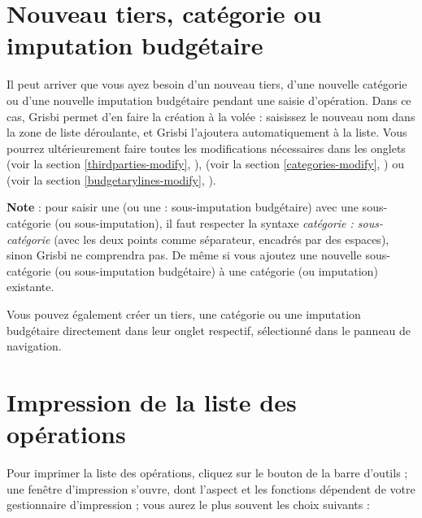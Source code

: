 \section{Nouveau tiers, catégorie ou imputation budgétaire\label{transactions-fillcombo}}


Il peut arriver que vous ayez besoin d'un nouveau tiers, d'une nouvelle catégorie ou d'une nouvelle imputation budgétaire pendant une saisie d'opération. Dans ce cas, Grisbi permet d'en faire la création \og à la volée \fg{} : saisissez le nouveau nom dans la zone de liste déroulante, et Grisbi l'ajoutera automatiquement à la liste. Vous pourrez ultérieurement faire toutes les modifications nécessaires dans les onglets  (voir la section \vref{thirdparties-modify}, ),  (voir la section \vref{categories-modify}, ) ou  (voir la section \vref{budgetarylines-modify}, ).
 
\textbf{Note} : pour saisir une 
 (ou une  : sous-imputation budgétaire) avec une sous-catégorie (ou sous-imputation), il faut respecter la syntaxe \emph{catégorie : sous-catégorie} (avec les deux points comme séparateur, encadrés par des espaces), sinon Grisbi ne comprendra pas. De même si vous ajoutez une nouvelle sous-catégorie (ou sous-imputation budgétaire) à une catégorie (ou imputation) existante.

Vous pouvez également créer un tiers, une catégorie ou une imputation budgétaire directement dans leur onglet respectif, sélectionné dans le panneau de navigation.


\section{Impression de la liste des opérations\label{transactions-print}}


Pour imprimer la liste des opérations, cliquez sur le bouton  de la barre d'outils ; une fenêtre d'impression s'ouvre, dont l'aspect et les fonctions dépendent de votre gestionnaire d'impression ; vous aurez le plus souvent les choix suivants :

